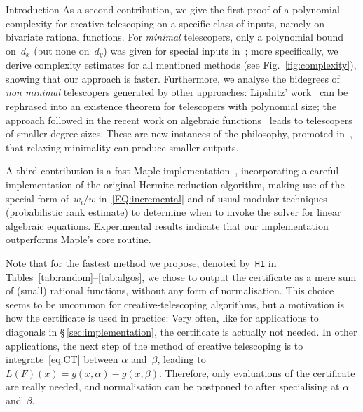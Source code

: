 \documentclass{sig-alt-full}
\begin{document}
\begin{section}{Introduction}
As a second contribution, we give the first proof of a polynomial
complexity for creative telescoping on a specific class of inputs,
namely on bivariate rational functions.
For \emph{minimal\/} telescopers, only a polynomial bound on~$d_x$ (but none
on~$d_y$) was given for special inputs in~\cite{GeddesLe2002};
more specifically, we derive complexity estimates for all
mentioned methods (see Fig.~\ref{fig:complexity}), showing that
our approach is faster.
Furthermore, we analyse the bidegrees of \emph{non minimal\/}
telescopers generated by other approaches:
Lipshitz' work~\cite{Lipshitz1988} can be
rephrased into an existence theorem for telescopers with
polynomial size; the approach followed in the recent work on
algebraic functions~\cite{BCLSS2007} leads to
telescopers of smaller degree sizes.
These are new instances of the philosophy, promoted in~\cite{BCLSS2007},
that relaxing minimality
can produce smaller outputs.

A third contribution is a fast Maple implementation~\cite{OurSoft},
incorporating a
careful implementation of the original Hermite reduction algorithm,
making use of the special form of~$w_i/w$ in~\eqref{EQ:incremental}
and of usual modular techniques (probabilistic rank estimate) to
determine when to invoke the solver for linear algebraic equations.
Experimental results indicate that our implementation
outperforms Maple's core routine.

Note that for the fastest method we propose, denoted by~\verb+H1+ in
Tables~\ref{tab:random}--\ref{tab:algos}, we chose to output the
certificate as a mere sum of (small) rational functions, without any
form of normalisation. This choice seems to be uncommon for
creative-telescoping algorithms, but a motivation is how the
certificate is used in practice: Very often, like for applications
to diagonals in \S\,\ref{sec:implementation}, the certificate is
actually not needed. In other applications, the next step of the
method of creative telescoping is to integrate~\eqref{eq:CT} between
$\alpha$ and~$\beta$, leading to $L(F)(x) = g(x, \alpha) - g(x,
\beta)$. Therefore, only evaluations of the certificate are really
needed, and normalisation can be postponed to after specialising at
$\alpha$ and~$\beta$.


\end{section}
\end{document}
